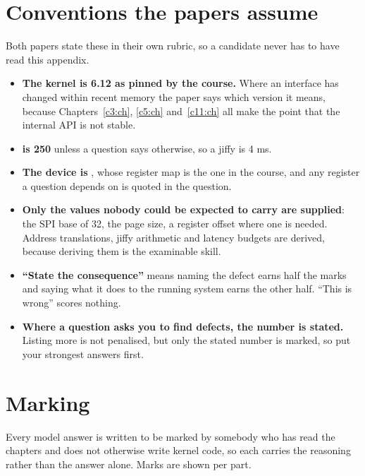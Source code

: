 \section*{Conventions the papers assume}
Both papers state these in their own rubric, so a candidate never has to have read this appendix.
\begin{itemize}
  \item \textbf{The kernel is 6.12 as pinned by the course.} Where an interface has changed within
    recent memory the paper says which version it means, because Chapters~\ref{c3:ch}, \ref{c5:ch}
    and~\ref{c11:ch} all make the point that the internal API is not stable.
  \item \textbf{ is 250} unless a question says otherwise, so a jiffy is 4 ms.
  \item \textbf{The device is }, whose register map is the one in the course, and any
    register a question depends on is quoted in the question.
  \item \textbf{Only the values nobody could be expected to carry are supplied}: the SPI base of 32,
    the page size, a register offset where one is needed. Address translations, jiffy arithmetic and
    latency budgets are derived, because deriving them is the examinable skill.
  \item \textbf{``State the consequence''} means naming the defect earns half the marks and saying
    what it does to the running system earns the other half. ``This is wrong'' scores nothing.
  \item \textbf{Where a question asks you to find defects, the number is stated.} Listing more is
    not penalised, but only the stated number is marked, so put your strongest answers first.
\end{itemize}

\section*{Marking}
Every model answer is written to be marked by somebody who has read the chapters and does not
otherwise write kernel code, so each carries the reasoning rather than the answer alone. Marks are
shown per part.

